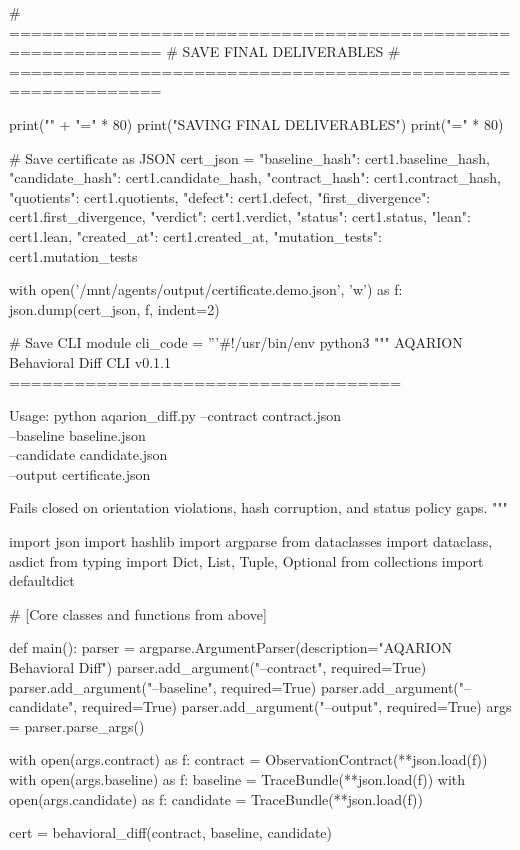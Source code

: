 # ============================================================
# SAVE FINAL DELIVERABLES
# ============================================================

print("\n" + "=" * 80)
print("SAVING FINAL DELIVERABLES")
print("=" * 80)

# Save certificate as JSON
cert_json = {
    "baseline_hash": cert1.baseline_hash,
    "candidate_hash": cert1.candidate_hash,
    "contract_hash": cert1.contract_hash,
    "quotients": cert1.quotients,
    "defect": cert1.defect,
    "first_divergence": cert1.first_divergence,
    "verdict": cert1.verdict,
    "status": cert1.status,
    "lean": cert1.lean,
    "created_at": cert1.created_at,
    "mutation_tests": cert1.mutation_tests
}

with open('/mnt/agents/output/certificate.demo.json', 'w') as f:
    json.dump(cert_json, f, indent=2)

# Save CLI module
cli_code = '''#!/usr/bin/env python3
"""
AQARION Behavioral Diff CLI v0.1.1
====================================

Usage:
    python aqarion_diff.py --contract contract.json \\
                           --baseline baseline.json \\
                           --candidate candidate.json \\
                           --output certificate.json

Fails closed on orientation violations, hash corruption, and status policy gaps.
"""

import json
import hashlib
import argparse
from dataclasses import dataclass, asdict
from typing import Dict, List, Tuple, Optional
from collections import defaultdict

# [Core classes and functions from above]

def main():
    parser = argparse.ArgumentParser(description="AQARION Behavioral Diff")
    parser.add_argument("--contract", required=True)
    parser.add_argument("--baseline", required=True)
    parser.add_argument("--candidate", required=True)
    parser.add_argument("--output", required=True)
    args = parser.parse_args()
    
    with open(args.contract) as f:
        contract = ObservationContract(**json.load(f))
    with open(args.baseline) as f:
        baseline = TraceBundle(**json.load(f))
    with open(args.candidate) as f:
        candidate = TraceBundle(**json.load(f))
    
    cert = behavioral_diff(contract, baseline, candidate)
    

